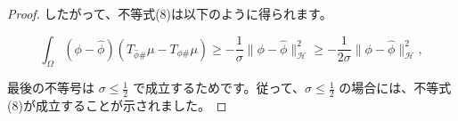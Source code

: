 \documentclass{jsarticle}
\theoremstyle{definition}
\begin{document}
\begin{proof}
したがって、不等式(8)は以下のように得られます。

$$
\int_\Omega (\phi - \hat{\phi})(T_{\hat{\phi} \#} \mu - T_{\phi \#} \mu) \geq - \frac{1}{\sigma} \|\phi - \hat{\phi}\|_{\mathcal{H}}^2 \geq - \frac{1}{2\sigma} \|\phi - \hat{\phi}\|_{\mathcal{H}}^2,
$$

最後の不等号は $\sigma \leq \frac{1}{2}$ で成立するためです。従って、$\sigma \leq \frac{1}{2}$ の場合には、不等式(8)が成立することが示されました。


\begin{comment}
左辺にCauchy-Schwarzの不等式を適用することから始めて、以下のようになります。

\begin{align*}
\int_\Omega(\phi - \hat{\phi})(T_{\hat{\phi} \#} \mu - T_{\phi \#} \mu) &\geq - \| \phi - \hat{\phi}\|_\mathcal{H} \|T_{\phi \#} \mu - T_{\hat{\phi} \#} \mu\|_\mathcal{H} \\
&\geq -\|\phi - \hat{\phi}\|_\mathcal{H} \|T\| \|\phi \# \mu - \hat{\phi \#} \mu|_\mathcal{H}
\end{align*}

2つめの不等式では、演算子$T$が連続であることを用いています。次に、右辺の第2項目において内積に対して再びCauchy-Schwarzの不等式を適用することで、

$$
\|\varphi \# \mu - \hat{\varphi} \# \mu\|_H = \langle \mu, \varphi - \hat{\varphi} \rangle_H \leq \|\mu\|_H \|\varphi - \hat{\varphi}\|_H
$$

を得ることができます。これを元の不等式に代入することで、

$$
(\varphi - \hat{\varphi})(T_{\hat{\varphi}} \# \mu - T_{\varphi} \# \mu) \geq -\|\varphi - \hat{\varphi}\|_H \|T\| \| \mu \|_H \| \varphi - \hat{\varphi} \|_H
$$

となります。この式をさらに整理すると、

$$
(\varphi - \hat{\varphi})(T_{\hat{\varphi}} \# \mu - T_{\varphi} \# \mu) \geq -\|\varphi - \hat{\varphi}\|_H^2 \|T\| \| \mu \|_H
$$

となります。最後に、$\sigma = \frac{1}{2|T||\mu|_H}$として、上の不等式に代入することで、

\begin{align*}
  J(\varphi) &\geq J(\hat{\varphi}) + \delta J_{\hat{\varphi}}(\varphi - \hat{\varphi}) - \frac{1}{2\sigma}|\varphi - \hat{\varphi}|H^2 \\
             &= J(\hat{\varphi}) + (\varphi - \hat{\varphi})(T{\hat{\varphi}} \# \mu - T_{\varphi} \# \mu) - \frac{1}{2\sigma}|\varphi - \hat{\varphi}|_H^2 \\
             &\geq J(\hat{\varphi}) -2\sigma |\varphi - \hat{\varphi}|_H^2 - \frac{1}{2\sigma}|\varphi - \hat{\varphi}|_H^2 \\
             &= J(\hat{\varphi}) - \frac{3}{2}\sigma |\varphi - \hat{\varphi}|_H^2.
\end{align*}

ここで、最後の不等式では先程導いた不等式を用いました。以上より、定理4の主張が示されました。

\end{comment}

\end{proof}
\end{document}
